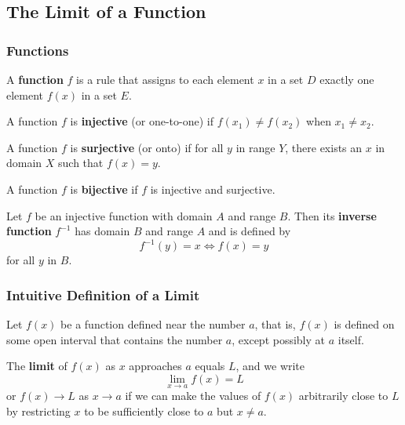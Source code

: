 \subsection{The Limit of a Function}

\subsubsection*{Functions}
\begin{definition}
    A \textbf{function} \(f\) is a rule that assigns to each element \(x\) in
    a set \(D\) exactly one element \(f(x)\) in a set \(E\).
\end{definition}
\begin{definition}
    A function \(f\) is \textbf{injective} (or one-to-one) if
    \(f(x_1)\neq f(x_2)\) when \(x_1\neq x_2\).
\end{definition}
\begin{definition}
    A function \(f\) is \textbf{surjective} (or onto) if for all \(y\) in
    range \(Y\),
    there exists an \(x\) in domain \(X\) such that \(f(x)=y\).
\end{definition}
\begin{definition}
    A function \(f\) is \textbf{bijective} if \(f\) is injective and surjective.
\end{definition}
\begin{definition}
    Let \(f\) be an injective function with domain \(A\) and range \(B\).
    Then its \textbf{inverse function} \(f^{-1}\) has domain \(B\) and range
    \(A\) and is defined by
    \[f^{-1}(y)=x\iff f(x)=y\]
    for all \(y\) in \(B\).
\end{definition}

\subsubsection*{Intuitive Definition of a Limit}
Let \(f(x)\) be a function defined near the number \(a\), that is, \(f(x)\) is
defined on some open interval that contains the number \(a\),
except possibly at \(a\) itself.
\begin{definition}
    The \textbf{limit} of \(f(x)\) as \(x\) approaches \(a\) equals \(L\), and
    we write
    \[\lim_{x\to a}f(x)=L\]
    or \(f(x)\to L\) as \(x\to a\)
    if we can make the values of \(f(x)\) arbitrarily close to \(L\) by
    restricting \(x\) to be sufficiently close to \(a\) but \(x\neq a\).
\end{definition}
